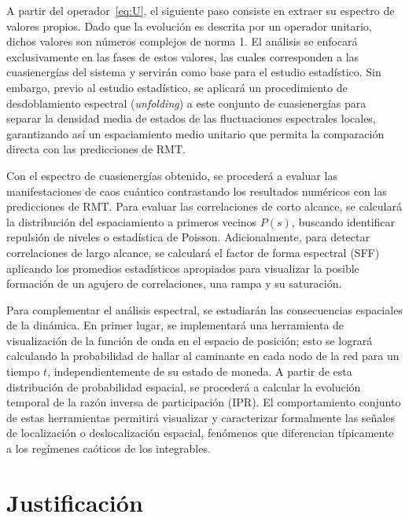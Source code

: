 \documentclass[11pt,a4paper]{article}  %
\begin{document}
A partir del operador~\eqref{eq:U}, el siguiente paso consiste en extraer su
espectro de valores propios. Dado que la evolución es descrita por un operador
unitario, dichos valores son números complejos de norma 1. El análisis se
enfocará exclusivamente en las fases de estos valores, las cuales corresponden
a las cuasienergías del sistema y servirán como base para el estudio
estadístico. Sin embargo, previo al estudio estadístico, se aplicará un
procedimiento de desdoblamiento espectral (\textit{unfolding}) a este conjunto
de cuasienergías para separar la densidad media de estados de las fluctuaciones
espectrales locales, garantizando así un espaciamiento medio unitario que
permita la comparación directa con las predicciones de RMT.

Con el espectro de cuasienergías obtenido, se procederá a evaluar las
manifestaciones de caos cuántico contrastando los resultados numéricos con las
predicciones de RMT. Para evaluar las correlaciones de corto alcance, se
calculará la distribución del espaciamiento a primeros vecinos $P(s)$, buscando
identificar repulsión de niveles o estadística de Poisson. Adicionalmente, para
detectar correlaciones de largo alcance, se calculará el factor de forma
espectral (SFF) aplicando los promedios estadísticos apropiados para visualizar
la posible formación de un agujero de correlaciones, una rampa y su saturación.

Para complementar el análisis espectral, se estudiarán las consecuencias
espaciales de la dinámica. En primer lugar, se implementará una herramienta de
visualización de la función de onda en el espacio de posición; esto se logrará
calculando la probabilidad de hallar al caminante en cada nodo de la red para
un tiempo $t$, independientemente de su estado de moneda. A partir de esta
distribución de probabilidad espacial, se procederá a calcular la evolución
temporal de la razón inversa de participación (IPR). El comportamiento conjunto
de estas herramientas permitirá visualizar y caracterizar formalmente las
señales de localización o deslocalización espacial, fenómenos que diferencian
típicamente a los regímenes caóticos de los integrables.

\section{Justificación}  %
\end{document}
